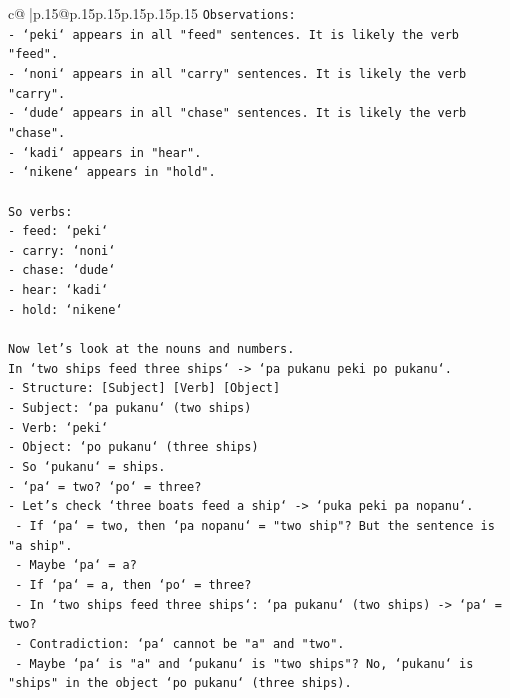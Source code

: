 \documentclass{article}
\begin{document}
{\begin{supertabular}{c@{$\;$}|p{.15\linewidth}@{}p{.15\linewidth}p{.15\linewidth}p{.15\linewidth}p{.15\linewidth}p{.15\linewidth}}
{{{\texttt{Observations:} \\
\texttt{{-} `peki` appears in all "feed" sentences. It is likely the verb "feed".} \\
\texttt{{-} `noni` appears in all "carry" sentences. It is likely the verb "carry".} \\
\texttt{{-} `dude` appears in all "chase" sentences. It is likely the verb "chase".} \\
\texttt{{-} `kadi` appears in "hear".} \\
\texttt{{-} `nikene` appears in "hold".} \\
\\ 
\texttt{So verbs:} \\
\texttt{{-} feed: `peki`} \\
\texttt{{-} carry: `noni`} \\
\texttt{{-} chase: `dude`} \\
\texttt{{-} hear: `kadi`} \\
\texttt{{-} hold: `nikene`} \\
\\ 
\texttt{Now let's look at the nouns and numbers.} \\
\texttt{In `two ships feed three ships` {-}> `pa pukanu peki po pukanu`.} \\
\texttt{{-} Structure: {[}Subject{]} {[}Verb{]} {[}Object{]}} \\
\texttt{{-} Subject: `pa pukanu` (two ships)} \\
\texttt{{-} Verb: `peki`} \\
\texttt{{-} Object: `po pukanu` (three ships)} \\
\texttt{{-} So `pukanu` = ships.} \\
\texttt{{-} `pa` = two? `po` = three?} \\
\texttt{{-} Let's check `three boats feed a ship` {-}> `puka peki pa nopanu`.} \\
\texttt{  {-} If `pa` = two, then `pa nopanu` = "two ship"? But the sentence is "a ship".} \\
\texttt{  {-} Maybe `pa` = a?} \\
\texttt{  {-} If `pa` = a, then `po` = three?} \\
\texttt{  {-} In `two ships feed three ships`: `pa pukanu` (two ships) {-}> `pa` = two?} \\
\texttt{  {-} Contradiction: `pa` cannot be "a" and "two".} \\
\texttt{  {-} Maybe `pa` is "a" and `pukanu` is "two ships"? No, `pukanu` is "ships" in the object `po pukanu` (three ships).} \\
}}}
\end{supertabular}}
\end{document}
